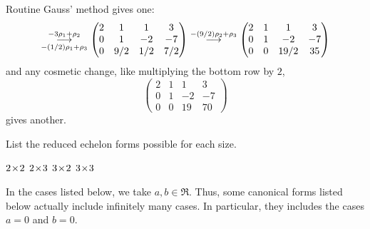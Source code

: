 \begin{exercises}
\begin{answer}
      Routine Gauss' method gives one:
      \begin{equation*}
        \grstep[-(1/2)\rho_1+\rho_3]{-3\rho_1+\rho_2}
        \begin{pmatrix}
          2  &1  &1  &3  \\
          0  &1  &-2 &-7 \\
          0  &9/2&1/2&7/2
        \end{pmatrix}
        \grstep{-(9/2)\rho_2+\rho_3}
        \begin{pmatrix}
          2  &1  &1    &3  \\
          0  &1  &-2   &-7 \\
          0  &0  &19/2 &35
        \end{pmatrix}
      \end{equation*}
      and any cosmetic change, like multiplying the bottom row by \( 2 \),
      \begin{equation*}
        \begin{pmatrix}
          2  &1  &1    &3  \\
          0  &1  &-2   &-7 \\
          0  &0  &19   &70
        \end{pmatrix}
      \end{equation*}
      gives another.  
    \end{answer}
  \recommended \item \label{exer:PossRedEchFrms} 
    List the reduced echelon forms possible for each size.
    \begin{exparts*}
      \partsitem \( \nbyn{2} \)
      \partsitem \( \nbym{2}{3} \)
      \partsitem \( \nbym{3}{2} \)
      \partsitem \( \nbyn{3} \)
    \end{exparts*}
    \begin{answer}
      In the cases listed below, we take $a,b\in\Re$.
      Thus, some canonical forms 
      listed below actually include infinitely many cases.
      In particular, they includes the cases $a=0$ and $b=0$.
\end{answer}
\end{exercises}
